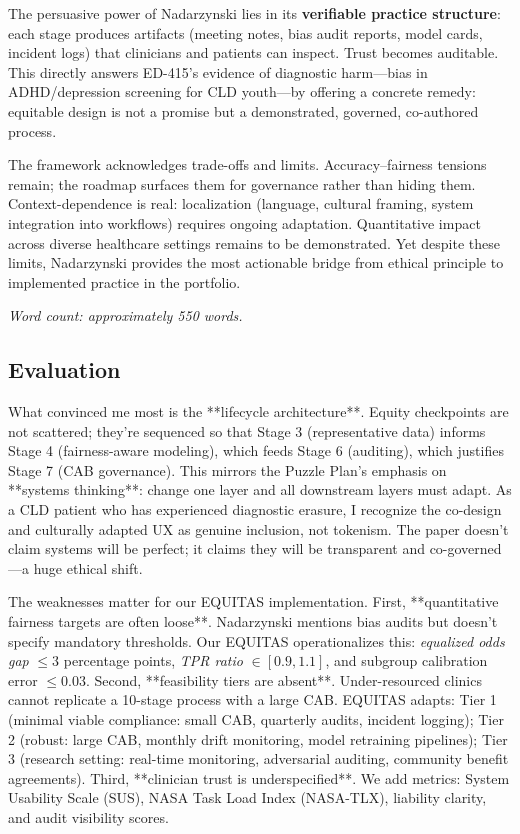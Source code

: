 \documentclass[12pt,twoside]{article}
\begin{document}
The persuasive power of Nadarzynski lies in its \textbf{verifiable practice structure}: each stage produces artifacts (meeting notes, bias audit reports, model cards, incident logs) that clinicians and patients can inspect. Trust becomes auditable. This directly answers ED-415's evidence of diagnostic harm—bias in ADHD/depression screening for CLD youth—by offering a concrete remedy: equitable design is not a promise but a demonstrated, governed, co-authored process.

The framework acknowledges trade-offs and limits. Accuracy–fairness tensions remain; the roadmap surfaces them for governance rather than hiding them. Context-dependence is real: localization (language, cultural framing, system integration into workflows) requires ongoing adaptation. Quantitative impact across diverse healthcare settings remains to be demonstrated. Yet despite these limits, Nadarzynski provides the most actionable bridge from ethical principle to implemented practice in the portfolio.

\emph{Word count: approximately 550 words.}

\subsection*{Evaluation}

What convinced me most is the **lifecycle architecture**. Equity checkpoints are not scattered; they're sequenced so that Stage 3 (representative data) informs Stage 4 (fairness-aware modeling), which feeds Stage 6 (auditing), which justifies Stage 7 (CAB governance). This mirrors the Puzzle Plan's emphasis on **systems thinking**: change one layer and all downstream layers must adapt. As a CLD patient who has experienced diagnostic erasure, I recognize the co-design and culturally adapted UX as genuine inclusion, not tokenism. The paper doesn't claim systems will be perfect; it claims they will be transparent and co-governed—a huge ethical shift.

The weaknesses matter for our EQUITAS implementation. First, **quantitative fairness targets are often loose**. Nadarzynski mentions bias audits but doesn't specify mandatory thresholds. Our EQUITAS operationalizes this: \emph{equalized odds gap} $\le 3$ percentage points, \emph{TPR ratio} $\in [0.9, 1.1]$, and subgroup calibration error $\le 0.03$. Second, **feasibility tiers are absent**. Under-resourced clinics cannot replicate a 10-stage process with a large CAB. EQUITAS adapts: Tier 1 (minimal viable compliance: small CAB, quarterly audits, incident logging); Tier 2 (robust: large CAB, monthly drift monitoring, model retraining pipelines); Tier 3 (research setting: real-time monitoring, adversarial auditing, community benefit agreements). Third, **clinician trust is underspecified**. We add metrics: System Usability Scale (SUS), NASA Task Load Index (NASA-TLX), liability clarity, and audit visibility scores.
\end{document}
